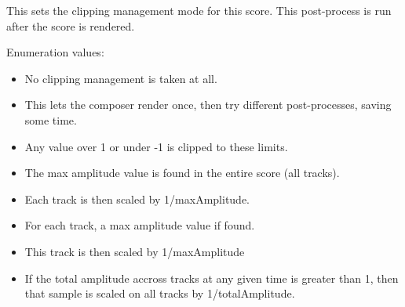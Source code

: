 This sets the clipping management mode for this score. This post-process is run after the score is rendered. \begin{Desc}
\item[Enumeration values: ]\par
\begin{description}
\item[{\em 
\hypertarget{classScore_w6w0}{
NONE}
\label{classScore_w6w0}
}]\begin{itemize}
\item No clipping management is taken at all.\item This lets the composer render once, then try different post-processes, saving some time. \end{itemize}
\item[{\em 
\hypertarget{classScore_w6w1}{
CLIP}
\label{classScore_w6w1}
}]\begin{itemize}
\item Any value over 1 or under -1 is clipped to these limits. \end{itemize}
\item[{\em 
\hypertarget{classScore_w6w2}{
SCALE}
\label{classScore_w6w2}
}]\begin{itemize}
\item The max amplitude value is found in the entire score (all tracks).\item Each track is then scaled by 1/max\-Amplitude. \end{itemize}
\item[{\em 
\hypertarget{classScore_w6w3}{
CHANNEL\_\-SCALE}
\label{classScore_w6w3}
}]\begin{itemize}
\item For each track, a max amplitude value if found.\item This track is then scaled by 1/max\-Amplitude \end{itemize}
\item[{\em 
\hypertarget{classScore_w6w4}{
ANTICLIP}
\label{classScore_w6w4}
}]\begin{itemize}
\item If the total amplitude accross tracks at any given time is greater than 1, then that sample is scaled on all tracks by 1/total\-Amplitude. \end{itemize}

\end{description}
\end{Desc}
